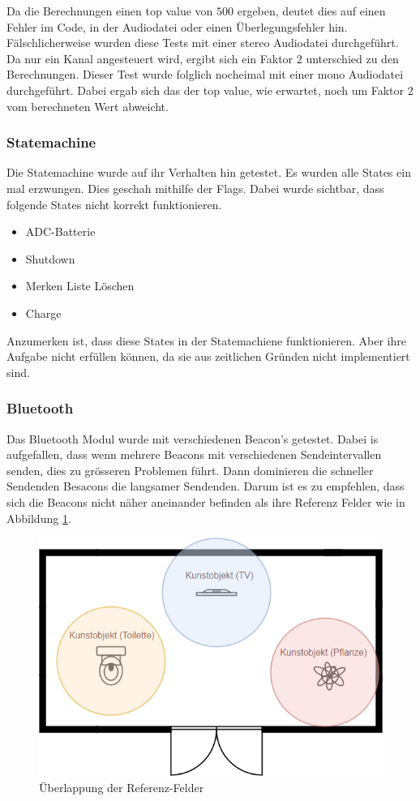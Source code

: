 Da die Berechnungen einen top value von $500$ ergeben, deutet dies auf einen Fehler im Code, in der Audiodatei oder einen Überlegungsfehler hin. Fälschlicherweise wurden diese Tests mit einer stereo Audiodatei durchgeführt. Da nur ein Kanal angesteuert wird, ergibt sich ein Faktor $2$ unterschied zu den Berechnungen. Dieser Test wurde folglich nocheimal mit einer mono Audiodatei durchgeführt. Dabei ergab sich das der top value, wie erwartet, noch um Faktor $2$ vom berechneten Wert abweicht.

\subsubsection{Statemachine}
Die Statemachine wurde auf ihr Verhalten hin getestet. Es wurden alle States ein mal erzwungen. Dies geschah mithilfe der Flags. Dabei wurde sichtbar, dass folgende States nicht korrekt funktionieren.

\begin{itemize}
	\item ADC-Batterie 
	\item Shutdown
	\item Merken Liste Löschen
	\item Charge
\end{itemize}

Anzumerken ist, dass diese States in der Statemachiene funktionieren.  Aber ihre Aufgabe nicht erfüllen können, da sie aus zeitlichen Gründen nicht implementiert sind.

\subsubsection{Bluetooth}
Das Bluetooth Modul wurde mit verschiedenen Beacon's getestet. Dabei is aufgefallen, dass wenn mehrere Beacons mit verschiedenen Sendeintervallen senden, dies zu grösseren Problemen führt. Dann dominieren die schneller Sendenden Besacons die langsamer Sendenden. Darum ist es zu empfehlen, dass sich die Beacons nicht näher aneinander befinden als ihre Referenz Felder wie in Abbildung \ref{fig:ref_felder}.

\begin{figure}[htbp!]
	\centering
	\includegraphics[scale=0.5]{data/validierung_software_ref_felder.png}
	\caption{Überlappung der Referenz-Felder}
	\label{fig:ref_felder}
\end{figure}

